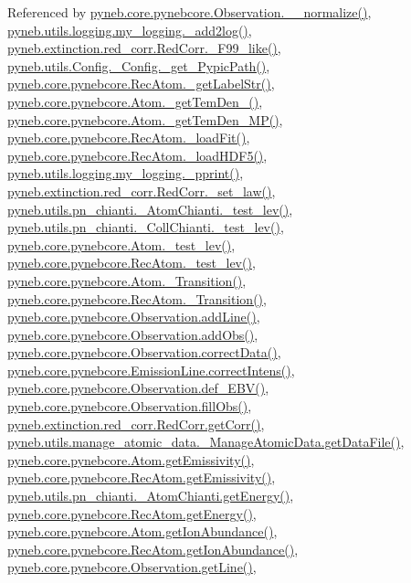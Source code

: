 Referenced by \hyperlink{pynebcore_8py_source_l04007}{pyneb.\-core.\-pynebcore.\-Observation.\-\_\-\-\_\-normalize()}, \hyperlink{logging_8py_source_l00059}{pyneb.\-utils.\-logging.\-my\-\_\-logging.\-\_\-add2log()}, \hyperlink{red__corr_8py_source_l00658}{pyneb.\-extinction.\-red\-\_\-corr.\-Red\-Corr.\-\_\-\-F99\-\_\-like()}, \hyperlink{_config_8py_source_l00115}{pyneb.\-utils.\-Config.\-\_\-\-Config.\-\_\-get\-\_\-\-Pypic\-Path()}, \hyperlink{pynebcore_8py_source_l02970}{pyneb.\-core.\-pynebcore.\-Rec\-Atom.\-\_\-get\-Label\-Str()}, \hyperlink{pynebcore_8py_source_l01869}{pyneb.\-core.\-pynebcore.\-Atom.\-\_\-get\-Tem\-Den\-\_()}, \hyperlink{pynebcore_8py_source_l02046}{pyneb.\-core.\-pynebcore.\-Atom.\-\_\-get\-Tem\-Den\-\_\-\-M\-P()}, \hyperlink{pynebcore_8py_source_l02754}{pyneb.\-core.\-pynebcore.\-Rec\-Atom.\-\_\-load\-Fit()}, \hyperlink{pynebcore_8py_source_l02714}{pyneb.\-core.\-pynebcore.\-Rec\-Atom.\-\_\-load\-H\-D\-F5()}, \hyperlink{logging_8py_source_l00051}{pyneb.\-utils.\-logging.\-my\-\_\-logging.\-\_\-pprint()}, \hyperlink{red__corr_8py_source_l00176}{pyneb.\-extinction.\-red\-\_\-corr.\-Red\-Corr.\-\_\-set\-\_\-law()}, \hyperlink{pn__chianti_8py_source_l00304}{pyneb.\-utils.\-pn\-\_\-chianti.\-\_\-\-Atom\-Chianti.\-\_\-test\-\_\-lev()}, \hyperlink{pn__chianti_8py_source_l00472}{pyneb.\-utils.\-pn\-\_\-chianti.\-\_\-\-Coll\-Chianti.\-\_\-test\-\_\-lev()}, \hyperlink{pynebcore_8py_source_l01525}{pyneb.\-core.\-pynebcore.\-Atom.\-\_\-test\-\_\-lev()}, \hyperlink{pynebcore_8py_source_l02672}{pyneb.\-core.\-pynebcore.\-Rec\-Atom.\-\_\-test\-\_\-lev()}, \hyperlink{pynebcore_8py_source_l01433}{pyneb.\-core.\-pynebcore.\-Atom.\-\_\-\-Transition()}, \hyperlink{pynebcore_8py_source_l02812}{pyneb.\-core.\-pynebcore.\-Rec\-Atom.\-\_\-\-Transition()}, \hyperlink{pynebcore_8py_source_l03558}{pyneb.\-core.\-pynebcore.\-Observation.\-add\-Line()}, \hyperlink{pynebcore_8py_source_l03589}{pyneb.\-core.\-pynebcore.\-Observation.\-add\-Obs()}, \hyperlink{pynebcore_8py_source_l04028}{pyneb.\-core.\-pynebcore.\-Observation.\-correct\-Data()}, \hyperlink{pynebcore_8py_source_l03447}{pyneb.\-core.\-pynebcore.\-Emission\-Line.\-correct\-Intens()}, \hyperlink{pynebcore_8py_source_l03983}{pyneb.\-core.\-pynebcore.\-Observation.\-def\-\_\-\-E\-B\-V()}, \hyperlink{pynebcore_8py_source_l03574}{pyneb.\-core.\-pynebcore.\-Observation.\-fill\-Obs()}, \hyperlink{red__corr_8py_source_l00211}{pyneb.\-extinction.\-red\-\_\-corr.\-Red\-Corr.\-get\-Corr()}, \hyperlink{manage__atomic__data_8py_source_l00297}{pyneb.\-utils.\-manage\-\_\-atomic\-\_\-data.\-\_\-\-Manage\-Atomic\-Data.\-get\-Data\-File()}, \hyperlink{pynebcore_8py_source_l01782}{pyneb.\-core.\-pynebcore.\-Atom.\-get\-Emissivity()}, \hyperlink{pynebcore_8py_source_l02990}{pyneb.\-core.\-pynebcore.\-Rec\-Atom.\-get\-Emissivity()}, \hyperlink{pn__chianti_8py_source_l00366}{pyneb.\-utils.\-pn\-\_\-chianti.\-\_\-\-Atom\-Chianti.\-get\-Energy()}, \hyperlink{pynebcore_8py_source_l02927}{pyneb.\-core.\-pynebcore.\-Rec\-Atom.\-get\-Energy()}, \hyperlink{pynebcore_8py_source_l02176}{pyneb.\-core.\-pynebcore.\-Atom.\-get\-Ion\-Abundance()}, \hyperlink{pynebcore_8py_source_l03083}{pyneb.\-core.\-pynebcore.\-Rec\-Atom.\-get\-Ion\-Abundance()}, \hyperlink{pynebcore_8py_source_l03665}{pyneb.\-core.\-pynebcore.\-Observation.\-get\-Line()}, 